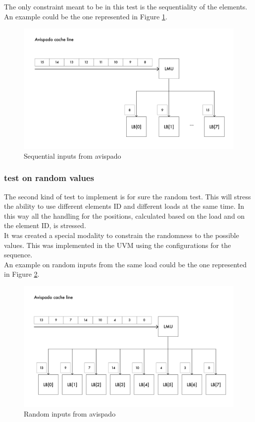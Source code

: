 The only constraint meant to be in this test is the sequentiality of the elements.\\
An example could be the one represented in Figure \ref{cache-to-lb-seq-ex}.


\begin{figure}[H]
    \centering
    \includegraphics[scale = 0.6]{Chapter_2/img/cache-to-lb-seq-ex.png}
    \caption{Sequential inputs from avispado}
    \label{cache-to-lb-seq-ex}
\end{figure}

\subsubsection{test on random values}
The second kind of test to implement is for sure the random test. This will stress the ability to use different elements ID and different loads at the same time. In this way all the handling for the positions, calculated based on the load and on the element ID, is stressed.\\

It was created a special modality to constrain the randomness to the possible values. This was implemented in the UVM using the configurations for the sequence.\\

An example on random inputs from the same load could be the one represented in Figure \ref{cache-to-lb-rnd-ex}.

\begin{figure}[H]
    \centering
    \includegraphics[scale = 0.6]{Chapter_2/img/cache-to-lb-rnd-ex.png}
    \caption{Random inputs from avispado}
    \label{cache-to-lb-rnd-ex}
\end{figure}

